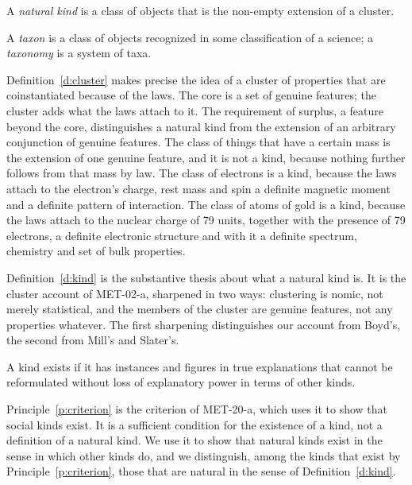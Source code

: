 \documentclass{situationist-preprint}
\begin{document}
\begin{definition}\label{d:kind}
A \emph{natural kind} is a class of objects that is the non-empty extension of a cluster.
\end{definition}

\begin{definition}[Taxon]\label{d:taxon}
A \emph{taxon} is a class of objects recognized in some classification of a science; a \emph{taxonomy} is a system of taxa.
\end{definition}

Definition~\ref{d:cluster} makes precise the idea of a cluster of properties that are coinstantiated because of the laws. The core is a set of genuine features; the cluster adds what the laws attach to it. The requirement of surplus, a feature beyond the core, distinguishes a natural kind from the extension of an arbitrary conjunction of genuine features. The class of things that have a certain mass is the extension of one genuine feature, and it is not a kind, because nothing further follows from that mass by law. The class of electrons is a kind, because the laws attach to the electron's charge, rest mass and spin a definite magnetic moment and a definite pattern of interaction. The class of atoms of gold is a kind, because the laws attach to the nuclear charge of 79 units, together with the presence of 79 electrons, a definite electronic structure and with it a definite spectrum, chemistry and set of bulk properties.

Definition~\ref{d:kind} is the substantive thesis about what a natural kind is. It is the cluster account of MET-02-a, sharpened in two ways: clustering is nomic, not merely statistical, and the members of the cluster are genuine features, not any properties whatever. The first sharpening distinguishes our account from Boyd's, the second from Mill's and Slater's.

\begin{principle}\label{p:criterion}
A kind exists if it has instances and figures in true explanations that cannot be reformulated without loss of explanatory power in terms of other kinds.
\end{principle}

Principle~\ref{p:criterion} is the criterion of MET-20-a, which uses it to show that social kinds exist. It is a sufficient condition for the existence of a kind, not a definition of a natural kind. We use it to show that natural kinds exist in the sense in which other kinds do, and we distinguish, among the kinds that exist by Principle~\ref{p:criterion}, those that are natural in the sense of Definition~\ref{d:kind}.
\end{document}
